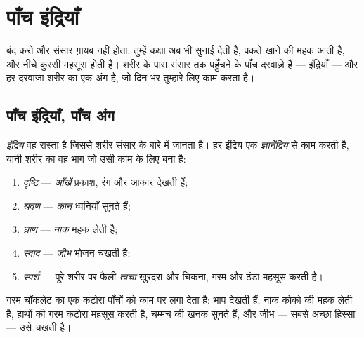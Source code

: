 \chapter{पाँच इंद्रियाँ}\label{ch:g1:the-five-senses}

 बंद करो और संसार ग़ायब नहीं होता: तुम्हें कक्षा अब भी सुनाई देती
है, पकते खाने की महक आती है, और नीचे कुरसी महसूस होती है। शरीर के पास
संसार तक पहुँचने के पाँच दरवाज़े हैं --- इंद्रियाँ --- और हर दरवाज़ा
शरीर का एक अंग है, जो दिन भर तुम्हारे लिए काम करता है।

\section{पाँच इंद्रियाँ, पाँच अंग}

\begin{definition}[इंद्रिय और ज्ञानेंद्रिय]\label{def:g1:the-five-senses:sense}
\emph{इंद्रिय} वह रास्ता है जिससे शरीर संसार के बारे
में जानता है। हर इंद्रिय एक \emph{ज्ञानेंद्रिय}
से काम करती है, यानी शरीर का वह भाग जो उसी काम के लिए बना है:
\begin{enumerate}
  \item \emph{दृष्टि} --- \emph{आँखें}
        प्रकाश, रंग और आकार देखती हैं;
  \item \emph{श्रवण} --- \emph{कान} ध्वनियाँ
        सुनते हैं;
  \item \emph{घ्राण} --- \emph{नाक} महक लेती
        है;
  \item \emph{स्वाद} --- \emph{जीभ} भोजन
        चखती है;
  \item \emph{स्पर्श} --- पूरे शरीर पर फैली
        \emph{त्वचा} खुरदरा और चिकना, गरम और ठंडा महसूस
        करती है।
\end{enumerate}
\end{definition}

\begin{example}[नाश्ता, इंद्रिय दर इंद्रिय]\label{ex:g1:the-five-senses:breakfast}
गरम चॉकलेट का एक कटोरा पाँचों को काम पर लगा देता है:  भाप देखती
हैं, नाक कोको की महक लेती है, हाथों की  गरम कटोरा महसूस करती है,
 चम्मच की खनक सुनते हैं, और जीभ --- सबसे अच्छा हिस्सा --- उसे चखती
है।
\end{example}

